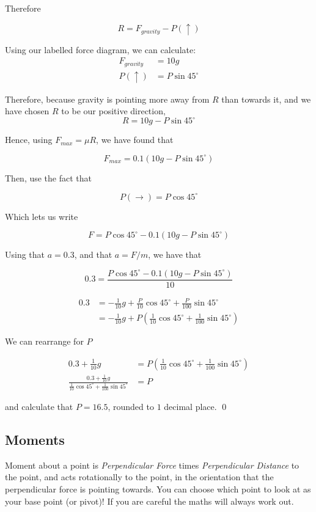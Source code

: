\begin{solution}
    Therefore 

    \[R = F_{gravity} - P(\uparrow)\]

    Using our labelled force diagram, we can calculate:
    \begin{align*}
    F_{gravity} &=  10g \\
    P(\uparrow) &= P\sin 45^\circ 
    \end{align*}

    Therefore,  because gravity is pointing more away from $R$ than towards it, and we have chosen $R$ to be our positive direction,
    \[R = 10g - P\sin 45^\circ  \]
    
    Hence, using $F_{max} = \mu R$, we have found that 

    \[ F_{max} = 0.1 (10g - P\sin 45^\circ )\]

    Then, use the fact that 

    \[P(\rightarrow) = P \cos 45^\circ\]

    Which lets us write
    
    \[ F = P \cos 45^\circ - 0.1 (10g - P\sin 45^\circ )\]

    Using that $a = 0.3$, and that $a = F/m$, we have that 

    \[ 0.3 = \frac{P \cos 45^\circ - 0.1 (10g - P\sin 45^\circ )}{10}\]

    \begin{align*}
        0.3 &= -\frac{1}{10}g + \frac{P}{10}\cos45^\circ + \frac{P}{100} \sin 45^\circ \tag{expanding} \\
        &= -\frac{1}{10}g + P(\frac{1}{10}\cos45^\circ + \frac{1}{100} \sin 45^\circ) \tag{collecting $P$ terms}
    \end{align*}

    We can rearrange for $P$ 

    \begin{align*}
        0.3 + \frac{1}{10}g &=  P(\frac{1}{10}\cos45^\circ + \frac{1}{100} \sin 45^\circ)  \\
        \frac{0.3 + \frac{1}{10}g }{\frac{1}{10}\cos45^\circ + \frac{1}{100} \sin 45^\circ} &= P
    \end{align*}
    
    and calculate that $P = 16.5$, rounded to $1$ decimal place.
    \qed
\end{solution}

\subsection{Moments}
Moment about a point is \emph{Perpendicular Force} times \emph{Perpendicular Distance} to the point, and acts rotationally to the point, in the orientation that the perpendicular force is pointing towards. 
You can choose which point to look at as your base point (or pivot)! If you are careful the maths will always work out.

